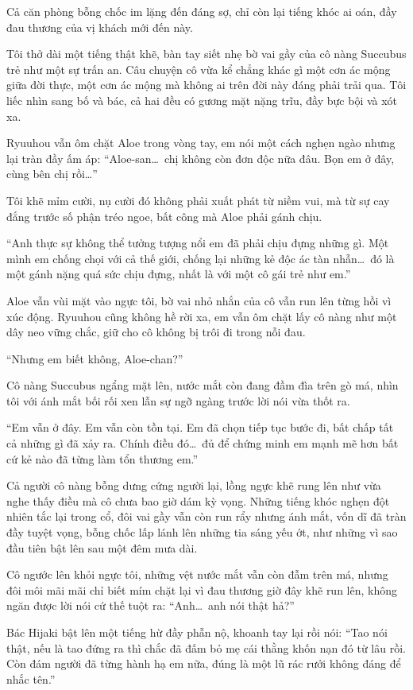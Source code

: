 \documentclass[../main.tex]{subfiles}
\begin{document}
Cả căn phòng bỗng chốc im lặng đến đáng sợ, chỉ còn lại tiếng khóc ai oán, đầy đau thương của vị khách mới đến này.

Tôi thở dài một tiếng thật khẽ, bàn tay siết nhẹ bờ vai gầy của cô nàng Succubus trẻ như một sự trấn an. Câu chuyện cô vừa kể chẳng khác gì một cơn ác mộng giữa đời thực, một cơn ác mộng mà không ai trên đời này đáng phải trải qua. Tôi liếc nhìn sang bố và bác, cả hai đều có gương mặt nặng trĩu, đầy bực bội và xót xa.

Ryuuhou vẫn ôm chặt Aloe trong vòng tay, em nói một cách nghẹn ngào nhưng lại tràn đầy ấm áp: ``Aloe-san\dots\ chị không còn đơn độc nữa đâu. Bọn em ở đây, cùng bên chị rồi\dots''

Tôi khẽ mỉm cười, nụ cười đó không phải xuất phát từ niềm vui, mà từ sự cay đắng trước số phận tréo ngoe, bất công mà Aloe phải gánh chịu.

``Anh thực sự không thể tưởng tượng nổi em đã phải chịu đựng những gì. Một mình em chống chọi với cả thế giới, chống lại những kẻ độc ác tàn nhẫn\dots\ đó là một gánh nặng quá sức chịu đựng, nhất là với một cô gái trẻ như em.''

Aloe vẫn vùi mặt vào ngực tôi, bờ vai nhỏ nhắn của cô vẫn run lên từng hồi vì xúc động. Ryuuhou cũng không hề rời xa, em vẫn ôm chặt lấy cô nàng như một dây neo vững chắc, giữ cho cô không bị trôi đi trong nỗi đau.

``Nhưng em biết không, Aloe-chan?''

Cô nàng Succubus ngẩng mặt lên, nước mắt còn đang đầm đìa trên gò má, nhìn tôi với ánh mắt bối rối xen lẫn sự ngỡ ngàng trước lời nói vừa thốt ra.

``Em vẫn ở đây. Em vẫn còn tồn tại. Em đã chọn tiếp tục bước đi, bất chấp tất cả những gì đã xảy ra. Chính điều đó\dots\ đủ để chứng minh em mạnh mẽ hơn bất cứ kẻ nào đã từng làm tổn thương em.''

Cả người cô nàng bỗng dưng cứng người lại, lồng ngực khẽ rung lên như vừa nghe thấy điều mà cô chưa bao giờ dám kỳ vọng. Những tiếng khóc nghẹn đột nhiên tắc lại trong cổ, đôi vai gầy vẫn còn run rẩy nhưng ánh mắt, vốn dĩ đã tràn đầy tuyệt vọng, bỗng chốc lấp lánh lên những tia sáng yếu ớt, như những vì sao đầu tiên bật lên sau một đêm mưa dài.

Cô ngước lên khỏi ngực tôi, những vệt nước mắt vẫn còn đẫm trên má, nhưng đôi môi mãi mãi chỉ biết mím chặt lại vì đau thương giờ đây khẽ run lên, không ngăn được lời nói cứ thế tuột ra: ``Anh\dots\ anh nói thật hả?''

Bác Hijaki bật lên một tiếng hừ đầy phẫn nộ, khoanh tay lại rồi nói: ``Tao nói thật, nếu là tao đứng ra thì chắc đã đấm bỏ mẹ cái thằng khốn nạn đó từ lâu rồi. Còn đám người đã từng hành hạ em nữa, đúng là một lũ rác rưởi không đáng để nhắc tên.''
\end{document}

